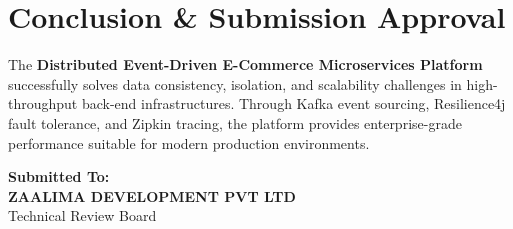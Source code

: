 \documentclass[11pt,a4paper]{article}
\begin{document}
\section{Conclusion \& Submission Approval}
The \textbf{Distributed Event-Driven E-Commerce Microservices Platform} successfully solves data consistency, isolation, and scalability challenges in high-throughput back-end infrastructures. Through Kafka event sourcing, Resilience4j fault tolerance, and Zipkin tracing, the platform provides enterprise-grade performance suitable for modern production environments.

\vspace{0.8cm}

\begin{center}
    \textbf{Submitted To:}\\
    \vspace{0.2cm}
    \textbf{ZAALIMA DEVELOPMENT PVT LTD}\\
    Technical Review Board
\end{center}
\end{document}
